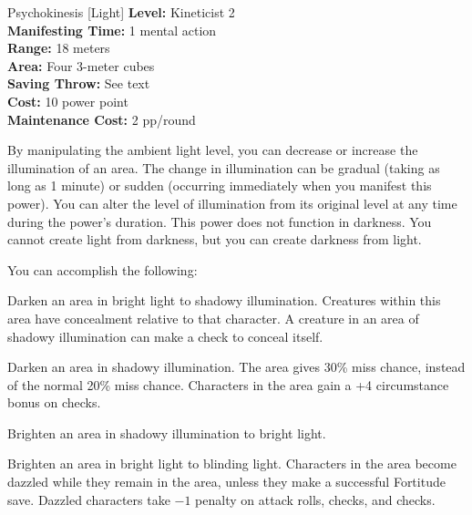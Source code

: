 {Psychokinesis [Light]}
{
	\textbf{Level:}
	Kineticist 2\\
	\textbf{Manifesting Time:}
	1 mental action\\
	\textbf{Range:}
	18 meters\\
	\textbf{Area:}
	Four 3-meter cubes\\
	\textbf{Saving Throw:}
	See text\\
	\textbf{Cost:}
	10 power point\\
	\textbf{Maintenance Cost:}
	2 pp/round\\
}
{
	By manipulating the ambient light level, you can decrease or increase the illumination of an area. The change in illumination can be gradual (taking as long as 1 minute) or sudden (occurring immediately when you manifest this power). You can alter the level of illumination from its original level at any time during the power's duration. This power does not function in darkness. You cannot create light from darkness, but you can create darkness from light.

	You can accomplish the following:
	\begin{itemize*}
	\item Darken an area in bright light to shadowy illumination. Creatures within this area have concealment relative to that character. A creature in an area of shadowy illumination can make a  check to conceal itself.
	\item Darken an area in shadowy illumination. The area gives 30\% miss chance, instead of the normal 20\% miss chance. Characters in the area gain a +4 circumstance bonus on  checks.
	\item Brighten an area in shadowy illumination to bright light.
	\item Brighten an area in bright light to blinding light. Characters in the area become dazzled while they remain in the area, unless they make a successful Fortitude save. Dazzled characters take $-1$ penalty on attack rolls,  checks, and  checks.
	\end{itemize*}
}